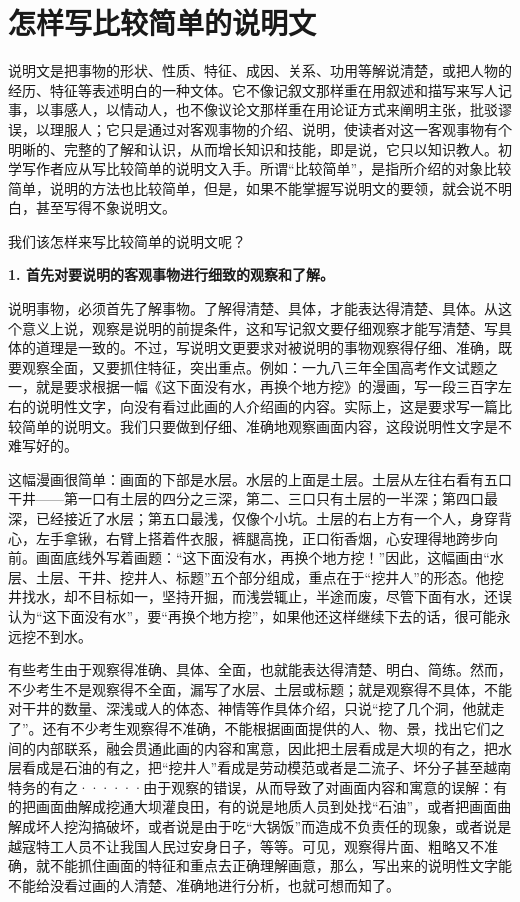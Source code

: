 \section{怎样写比较简单的说明文}

说明文是把事物的形状、性质、特征、成因、关系、功用等解说清楚，或把人物的经历、特征等表述明白的一种文体。它不像记叙文那样重在用叙述和描写来写人记事，以事感人，以情动人，也不像议论文那样重在用论证方式来阐明主张，批驳谬误，以理服人；它只是通过对客观事物的介绍、说明，使读者对这一客观事物有个明晰的、完整的了解和认识，从而增长知识和技能，即是说，它只以知识教人。初学写作者应从写比较简单的说明文入手。所谓“比较简单”，是指所介绍的对象比较简单，说明的方法也比较简单，但是，如果不能掌握写说明文的要领，就会说不明白，甚至写得不象说明文。

我们该怎样来写比较简单的说明文呢？

\textbf{1. 首先对要说明的客观事物进行细致的观察和了解。}

说明事物，必须首先了解事物。了解得清楚、具体，才能表达得清楚、具体。从这个意义上说，观察是说明的前提条件，这和写记叙文要仔细观察才能写清楚、写具体的道理是一致的。不过，写说明文更要求对被说明的事物观察得仔细、准确，既要观察全面，又要抓住特征，突出重点。例如：一九八三年全国高考作文试题之一，就是要求根据一幅《这下面没有水，再换个地方挖》的漫画，写一段三百字左右的说明性文字，向没有看过此画的人介绍画的内容。实际上，这是要求写一篇比较简单的说明文。我们只要做到仔细、准确地观察画面内容，这段说明性文字是不难写好的。

这幅漫画很简单：画面的下部是水层。水层的上面是土层。土层从左往右看有五口干井——第一口有土层的四分之三深，第二、三口只有土层的一半深；第四口最深，已经接近了水层；第五口最浅，仅像个小坑。土层的右上方有一个人，身穿背心，左手拿锹，右臂上搭着件衣服，裤腿高挽，正口衔香烟，心安理得地跨步向前。画面底线外写着画题：“这下面没有水，再换个地方挖！”因此，这幅画由“水层、土层、干井、挖井人、标题”五个部分组成，重点在于“挖井人”的形态。他挖井找水，却不目标如一，坚持开掘，而浅尝辄止，半途而废，尽管下面有水，还误认为“这下面没有水”，要“再换个地方挖”，如果他还这样继续下去的话，很可能永远挖不到水。

有些考生由于观察得准确、具体、全面，也就能表达得清楚、明白、简练。然而，不少考生不是观察得不全面，漏写了水层、土层或标题；就是观察得不具体，不能对干井的数量、深浅或人的体态、神情等作具体介绍，只说“挖了几个洞，他就走了”。还有不少考生观察得不准确，不能根据画面提供的人、物、景，找出它们之间的内部联系，融会贯通此画的内容和寓意，因此把土层看成是大坝的有之，把水层看成是石油的有之，把“挖井人”看成是劳动模范或者是二流子、坏分子甚至越南特务的有之······由于观察的错误，从而导致了对画面内容和寓意的误解：有的把画面曲解成挖通大坝灌良田，有的说是地质人员到处找“石油”，或者把画面曲解成坏人挖沟搞破坏，或者说是由于吃“大锅饭”而造成不负责任的现象，或者说是越寇特工人员不让我国人民过安身日子，等等。可见，观察得片面、粗略又不准确，就不能抓住画面的特征和重点去正确理解画意，那么，写出来的说明性文字能不能给没看过画的人清楚、准确地进行分析，也就可想而知了。

